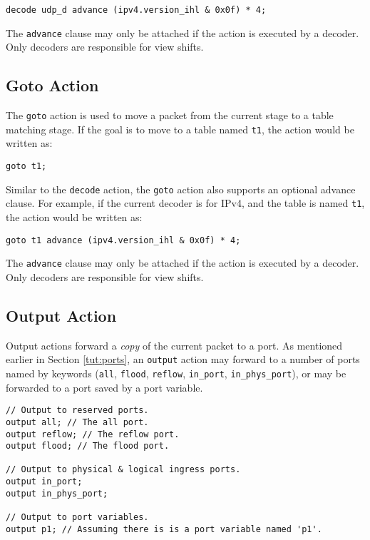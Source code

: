\begin{lstlisting}
decode udp_d advance (ipv4.version_ihl & 0x0f) * 4;
\end{lstlisting}

The \texttt{advance} clause may only be attached if the action is executed by a
decoder. Only decoders are responsible for view shifts.

\subsection{Goto Action} \label{tut:goto_action}

The \texttt{goto} action is used to move a packet from the current stage to a
table matching stage. If the goal is to move to a table named \texttt{t1}, the
action would be written as:

\begin{lstlisting}
goto t1;
\end{lstlisting}

Similar to the \texttt{decode} action, the \texttt{goto} action also supports an
optional advance clause. For example, if the current decoder is for IPv4, and
the table is named \texttt{t1}, the action would be written as:

\begin{lstlisting}
goto t1 advance (ipv4.version_ihl & 0x0f) * 4;
\end{lstlisting}

The \texttt{advance} clause may only be attached if the action is executed by a
decoder. Only decoders are responsible for view shifts.

\subsection{Output Action} \label{tut:output_action}

Output actions forward a \textit{copy} of the current packet to a port. As
mentioned earlier in Section \ref{tut:ports}, an \texttt{output} action may forward to a
number of ports named by keywords (\texttt{all}, \texttt{flood},
\texttt{reflow}, \texttt{in\_port}, \texttt{in\_phys\_port}), or may be
forwarded to a port saved by a port variable.

\begin{codepage}
\begin{lstlisting}
// Output to reserved ports.
output all; // The all port.
output reflow; // The reflow port.
output flood; // The flood port.

// Output to physical & logical ingress ports.
output in_port;
output in_phys_port;

// Output to port variables.
output p1; // Assuming there is is a port variable named 'p1'.
\end{lstlisting}
\end{codepage}

